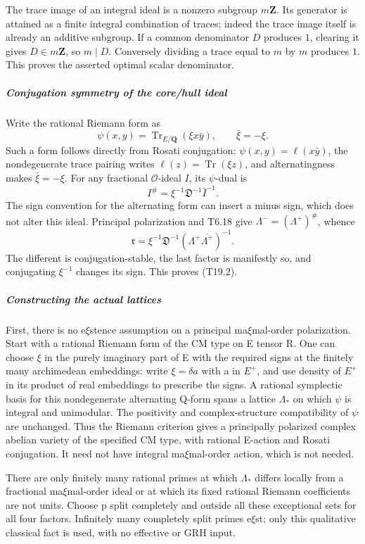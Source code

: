 The trace image of an integral ideal is a nonzero subgroup \(m\mathbf Z\). Its generator is attained as a finite integral combination of traces; indeed the trace image itself is already an additive subgroup. If a common denominator \(D\) produces \(1\), clearing it gives \(D\in m\mathbf Z\), so \(m\mid D\). Conversely dividing a trace equal to \(m\) by \(m\) produces \(1\). This proves the asserted optimal scalar denominator.

\subparagraph{Conjugation symmetry of the core/hull ideal}\label{conjugation-symmetry-of-the-corehull-ideal}

Write the rational Riemann form as \[
 \psi(x,y)=\operatorname{Tr}_{E/\mathbf Q}(\xi x\bar y),
 \qquad \bar\xi=-\xi.
 \tag{T19.12}
\] Such a form follows directly from Rosati conjugation: \(\psi(x,y)=\ell(x\bar y)\), the nondegenerate trace pairing writes \(\ell(z)=\operatorname{Tr}(\xi z)\), and alternatingness makes \(\bar\xi=-\xi\). For any fractional \(\mathcal O\)-ideal \(I\), its \(\psi\)-dual is \[
 I^\#=\xi^{-1}\mathfrak D^{-1}\bar I^{-1}.
\] The sign convention for the alternating form can insert a minus sign, which does not alter this ideal. Principal polarization and T6.18 give \(\Lambda^-=(\Lambda^+)^\#\), whence \[
 \mathfrak r
 =\xi^{-1}\mathfrak D^{-1}(\Lambda^+\overline{\Lambda^+})^{-1}.
 \tag{T19.13}
\] The different is conjugation-stable, the last factor is manifestly so, and conjugating \(\xi^{-1}\) changes its sign. This proves (T19.2).

\subparagraph{Constructing the actual lattices}\label{constructing-the-actual-lattices}

First, there is no e\(\xi\)stence assumption on a principal ma\(\xi\)mal-order polarization. Start with a rational Riemann form of the CM type on E tensor R. One can choose \(\xi\) in the purely imaginary part of E with the required signs at the finitely many archimedean embeddings: write \(\xi=\delta a\) with a in \(E^+\), and use density of \(E^+\) in its product of real embeddings to prescribe the signs. A rational symplectic basis for this nondegenerate alternating Q-form spans a lattice \(\Lambda_*\) on which \(\psi\) is integral and unimodular. The positivity and complex-structure compatibility of \(\psi\) are unchanged. Thus the Riemann criterion gives a principally polarized complex abelian variety of the specified CM type, with rational E-action and Rosati conjugation. It need not have integral ma\(\xi\)mal-order action, which is not needed.

There are only finitely many rational primes at which \(\Lambda_*\) differs locally from a fractional ma\(\xi\)mal-order ideal or at which its fixed rational Riemann coefficients are not units. Choose p split completely and outside all these exceptional sets for all four factors. Infinitely many completely split primes e\(\xi\)st; only this qualitative classical fact is used, with no effective or GRH input.

